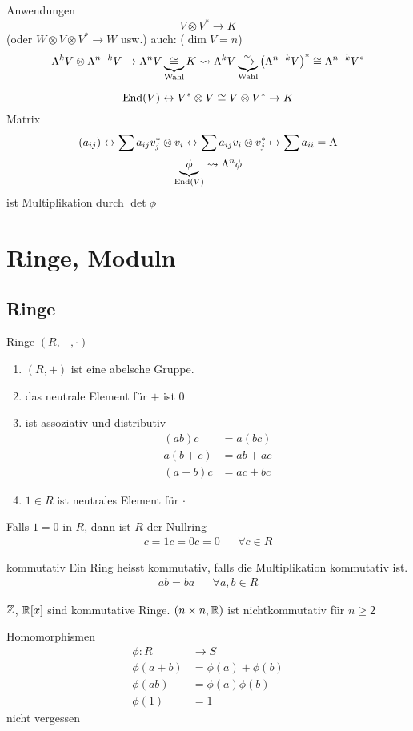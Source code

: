 \begin{Bsp}
  Anwendungen
  \[V\otimes V^*\to K\]
  (oder $W\otimes V\otimes V^*\to W$ usw.) auch: ($\dim V=n$)
  \[\Lambda^kV\otimes \Lambda^{n-k}V\to\Lambda^nV\underbrace{\cong}_{\text{Wahl}} K\rightsquigarrow\Lambda^kV\underbrace{\xrightarrow{\sim}}_{\text{Wahl}}\left( \Lambda^{n-k}V \right)^*\cong\Lambda^{n-k}V^*\]
\end{Bsp}
\begin{Bsp}
  \[\operatorname{End} (V)\leftrightarrow V^*\otimes V\cong V\otimes V^*\to K\]
  Matrix 
  \[(a_{ij})\leftrightarrow\sum a_{ij}v_j^*\otimes v_i\leftrightarrow\sum a_{ij}v_i\otimes v_j^*\mapsto \sum a_{ii}=\text{A}\]
  \[\underbrace{\phi}_{\operatorname{End}(V)}\rightsquigarrow\Lambda^n\phi\]
  ist Multiplikation durch $\det\phi$
\end{Bsp}
\section{Ringe, Moduln}
\subsection{Ringe}
\begin{Def}{Ringe $(R,+,\cdot)$}
  \begin{enumerate}
    \item $(R,+)$ ist eine abelsche Gruppe.
    \item das neutrale Element für $+$ ist 0
    \item ist assoziativ und distributiv
      \begin{align*}
        \left( ab \right)c&=a\left( bc \right)\\
        a\left( b+c \right)&=ab+ac\\
        \left( a+b \right)c&=ac+bc
      \end{align*}
    \item $1\in R$ ist neutrales Element für $\cdot$
  \end{enumerate}
\end{Def}
\begin{Bem}
  Falls $1=0$ in $R$, dann ist $R$ der Nullring
  \begin{align*}
    c=1c=0c=0&&\forall c\in R
  \end{align*}
\end{Bem}
\begin{Def}{kommutativ}
  Ein Ring heisst kommutativ, falls die Multiplikation kommutativ ist.
  \begin{align*}
    ab=ba&&\forall a,b\in R
  \end{align*}
\end{Def}
\begin{Bsp}
  $\mathbb{Z}$, $\mathbb{R}[x]$ sind kommutative Ringe. $(n\times n, \mathbb{R})$ ist nichtkommutativ für $n\geq 2$
\end{Bsp}
\begin{Bem}{Homomorphismen}
  \begin{align*}
    \phi:R&\to S\\
    \phi(a+b)&=\phi(a)+\phi(b)\\
    \phi(ab)&=\phi(a)\phi(b)\\
    \phi(1)&=1
  \end{align*}
  nicht vergessen
\end{Bem}
